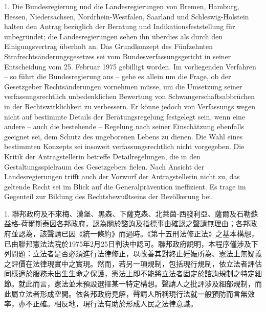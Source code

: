 \documentclass[12pt]{article}
\begin{document}
\begin{sourcepara}[title={原文理由 B.II.1}]
1. Die Bundesregierung und die Landesregierungen von Bremen, Hamburg, Hessen, Niedersachsen, Nordrhein-Westfalen, Saarland und Schleswig-Holstein halten den Antrag bezüglich der Beratung und Indikationsfeststellung für unbegründet; die Landesregierungen sehen ihn überdies als durch den Einigungsvertrag überholt an. Das Grundkonzept des Fünfzehnten Strafrechtsänderungsgesetzes sei vom Bundesverfassungsgericht in seiner Entscheidung vom 25. Februar 1975 gebilligt worden. Im vorliegenden Verfahren -- so führt die Bundesregierung aus -- gehe es allein um die Frage, ob der Gesetzgeber Rechtsänderungen vornehmen müsse, um die Umsetzung seiner verfassungsrechtlich unbedenklichen Bewertung von Schwangerschaftsabbrüchen in der Rechtswirklichkeit zu verbessern. Er könne jedoch von Verfassungs wegen nicht auf bestimmte Details der Beratungsregelung festgelegt sein, wenn eine andere -- auch die bestehende -- Regelung nach seiner Einschätzung ebenfalls geeignet sei, dem Schutz des ungeborenen Lebens zu dienen. Die Wahl eines bestimmten Konzepts sei insoweit verfassungsrechtlich nicht vorgegeben. Die Kritik der Antragstellerin betreffe Detailregelungen, die in den Gestaltungsspielraum des Gesetzgebers fielen. Nach Ansicht der Landesregierungen trifft auch der Vorwurf der Antragstellerin nicht zu, das geltende Recht sei im Blick auf die Generalprävention ineffizient. Es trage im Gegenteil zur Bildung des Rechtsbewußtseins der Bevölkerung bei.
\end{sourcepara}
\begin{transpara}
1. 聯邦政府及不來梅、漢堡、黑森、下薩克森、北萊茵-西發利亞、薩爾及石勒蘇益格-荷爾斯泰因各邦政府，認為關於諮詢及指標事由確認之聲請無理由；各邦政府並認為，該聲請已因《統一條約》而過時。《第十五刑法修正法》之基本構想，已由聯邦憲法法院於1975年2月25日判決中認可。聯邦政府說明，本程序僅涉及下列問題：立法者是否必須進行法律修正，以改善其對終止妊娠所為、憲法上無疑義之評價在法律現實中之實現。然而，若另一項規制，包括現行規制，依立法者評估同樣適於服務未出生生命之保護，憲法上即不能將立法者固定於諮詢規制之特定細節。就此而言，憲法並未預設選擇某一特定構想。聲請人之批評涉及細部規制，而此屬立法者形成空間。依各邦政府見解，聲請人所稱現行法就一般預防而言無效率，亦不正確。相反地，現行法有助於形成人民之法律意識。
\end{transpara}
\end{document}
